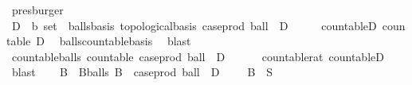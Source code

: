 \begin{isabellebody}
\ presburger\isanewline
\ \ \isamarkupfalse%
\isanewline
\isanewline
\ \ \isamarkupfalse%
\ D\ {\isacharcolon}{\kern0pt}{\isacharcolon}{\kern0pt}\ {\isachardoublequoteopen}{\isacharprime}{\kern0pt}b\ set{\isachardoublequoteclose}\ \ balls{\isacharunderscore}{\kern0pt}basis{\isacharcolon}{\kern0pt}\ {\isachardoublequoteopen}topological{\isacharunderscore}{\kern0pt}basis\ {\isacharparenleft}{\kern0pt}case{\isacharunderscore}{\kern0pt}prod\ ball\ {\isacharbackquote}{\kern0pt}\ {\isacharparenleft}{\kern0pt}D\ {\isasymtimes}\ {\isacharparenleft}{\kern0pt}{\isasymrat}\ {\isasyminter}\ {\isacharbraceleft}{\kern0pt}{}{\isacharless}{\kern0pt}{\isachardot}{\kern0pt}{\isachardot}{\kern0pt}{\isacharbraceright}{\kern0pt}{\isacharparenright}{\kern0pt}{\isacharparenright}{\kern0pt}{\isacharparenright}{\kern0pt}{\isachardoublequoteclose}\ \ countable{\isacharunderscore}{\kern0pt}D{\isacharcolon}{\kern0pt}\ {\isachardoublequoteopen}countable\ D{\isachardoublequoteclose}\ \isamarkupfalse%
\ balls{\isacharunderscore}{\kern0pt}countable{\isacharunderscore}{\kern0pt}basis\ \isamarkupfalse%
\ blast\isanewline
\ \ \isamarkupfalse%
\ countable{\isacharunderscore}{\kern0pt}balls{\isacharcolon}{\kern0pt}\ {\isachardoublequoteopen}countable\ {\isacharparenleft}{\kern0pt}case{\isacharunderscore}{\kern0pt}prod\ ball\ {\isacharbackquote}{\kern0pt}\ {\isacharparenleft}{\kern0pt}D\ {\isasymtimes}\ {\isacharparenleft}{\kern0pt}{\isasymrat}\ {\isasyminter}\ {\isacharbraceleft}{\kern0pt}{}{\isacharless}{\kern0pt}{\isachardot}{\kern0pt}{\isachardot}{\kern0pt}{\isacharbraceright}{\kern0pt}{\isacharparenright}{\kern0pt}{\isacharparenright}{\kern0pt}{\isacharparenright}{\kern0pt}{\isachardoublequoteclose}\ \isamarkupfalse%
\ countable{\isacharunderscore}{\kern0pt}rat\ countable{\isacharunderscore}{\kern0pt}D\ \isamarkupfalse%
\ blast\isanewline
\isanewline
\ \ \isamarkupfalse%
\ B\ \ B{\isacharunderscore}{\kern0pt}balls{\isacharcolon}{\kern0pt}\ {\isachardoublequoteopen}B\ {\isasymsubseteq}\ case{\isacharunderscore}{\kern0pt}prod\ ball\ {\isacharbackquote}{\kern0pt}\ {\isacharparenleft}{\kern0pt}D\ {\isasymtimes}\ {\isacharparenleft}{\kern0pt}{\isasymrat}\ {\isasyminter}\ {\isacharbraceleft}{\kern0pt}{}{\isacharless}{\kern0pt}{\isachardot}{\kern0pt}{\isachardot}{\kern0pt}{\isacharbraceright}{\kern0pt}{\isacharparenright}{\kern0pt}{\isacharparenright}{\kern0pt}{\isachardoublequoteclose}\ {\isachardoublequoteopen}{\isasymUnion}B\ {\isacharequal}{\kern0pt}\ {\isacharminus}{\kern0pt}S{\isachardoublequoteclose}\ \isamarkupfalse%

\end{isabellebody}

